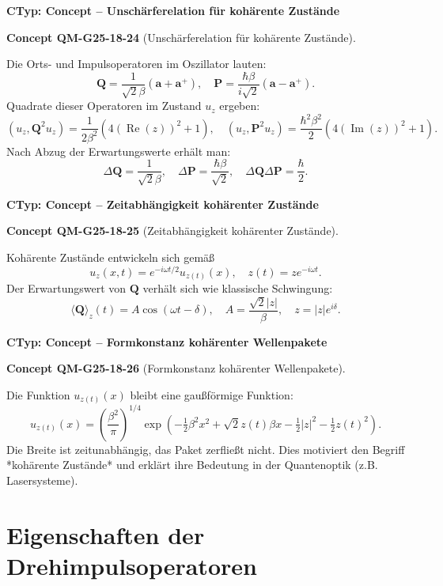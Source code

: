 \documentclass[10pt, letterpaper]{article}
\newcommand{\CustomHeading}[3]{%
  \par\medskip\noindent%
  \textbf{#1 #2} \textnormal{(#3)}.\enskip%
}
\newenvironment{CONC}[2]{\begin{unitbox}\CustomHeading{Concept}{#1}{#2}}{\end{unitbox}}
\begin{document}
\textbf{CTyp: Concept – Unschärferelation für kohärente Zustände}

\begin{CONC}{QM-G25-18-24}{Unschärferelation für kohärente Zustände}
Die Orts- und Impulsoperatoren im Oszillator lauten:
\[
\mathbf{Q} = \frac{1}{\sqrt{2}\beta}(\mathbf{a} + \mathbf{a}^+), \quad \mathbf{P} = \frac{\hbar\beta}{i\sqrt{2}}(\mathbf{a} - \mathbf{a}^+).
\]
Quadrate dieser Operatoren im Zustand $u_z$ ergeben:
\[
\left(u_z, \mathbf{Q}^2 u_z \right) = \frac{1}{2\beta^2} \left( 4 (\operatorname{Re}(z))^2 + 1 \right), \quad
\left(u_z, \mathbf{P}^2 u_z \right) = \frac{\hbar^2 \beta^2}{2} \left( 4 (\operatorname{Im}(z))^2 + 1 \right).
\]
Nach Abzug der Erwartungswerte erhält man:
\[
\Delta \mathbf{Q} = \frac{1}{\sqrt{2}\beta}, \quad \Delta \mathbf{P} = \frac{\hbar \beta}{\sqrt{2}}, \quad \Delta \mathbf{Q} \Delta \mathbf{P} = \frac{\hbar}{2}.
\]
\end{CONC}



\textbf{CTyp: Concept – Zeitabhängigkeit kohärenter Zustände}

\begin{CONC}{QM-G25-18-25}{Zeitabhängigkeit kohärenter Zustände}
Kohärente Zustände entwickeln sich gemäß
\[
u_z(x,t) = e^{-i \omega t/2} u_{z(t)}(x), \quad z(t) = z e^{-i \omega t}.
\]
Der Erwartungswert von $\mathbf{Q}$ verhält sich wie klassische Schwingung:
\[
\langle \mathbf{Q} \rangle_z(t) = A \cos(\omega t - \delta), \quad A = \frac{\sqrt{2} |z|}{\beta}, \quad z = |z| e^{i\delta}.
\]
\end{CONC}


\textbf{CTyp: Concept – Formkonstanz kohärenter Wellenpakete}

\begin{CONC}{QM-G25-18-26}{Formkonstanz kohärenter Wellenpakete}
Die Funktion $u_{z(t)}(x)$ bleibt eine gaußförmige Funktion:
\[
u_{z(t)}(x) = \left( \frac{\beta^2}{\pi} \right)^{1/4} \exp\left( -\tfrac{1}{2} \beta^2 x^2 + \sqrt{2} z(t) \beta x - \tfrac{1}{2}|z|^2 - \tfrac{1}{2} z(t)^2 \right).
\]
Die Breite ist zeitunabhängig, das Paket zerfließt nicht. Dies motiviert den Begriff *kohärente Zustände* und erklärt ihre Bedeutung in der Quantenoptik (z.B. Lasersysteme).
\end{CONC}





\pagebreak



\section{Eigenschaften der Drehimpulsoperatoren}
\end{document}
